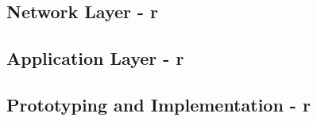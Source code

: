 \subsection{Network Layer - r}

\subsection{Application Layer - r}

\subsection{Prototyping and Implementation - r}
